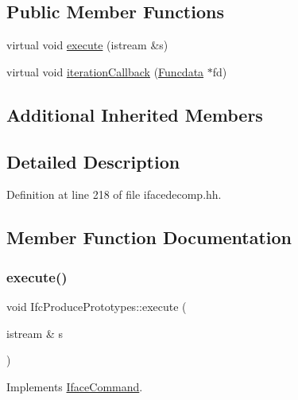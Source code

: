 \subsection*{Public Member Functions}
\begin{DoxyCompactItemize}
\item 
virtual void \mbox{\hyperlink{class_ifc_produce_prototypes_a26647bb5ac26d0ab368034f8c1823289}{execute}} (istream \&s)
\item 
virtual void \mbox{\hyperlink{class_ifc_produce_prototypes_abff378a291a5e7dd0c24d8ced5c9c4ea}{iteration\+Callback}} (\mbox{\hyperlink{class_funcdata}{Funcdata}} $\ast$fd)
\end{DoxyCompactItemize}
\subsection*{Additional Inherited Members}


\subsection{Detailed Description}


Definition at line 218 of file ifacedecomp.\+hh.



\subsection{Member Function Documentation}
\mbox{\label{class_ifc_produce_prototypes_a26647bb5ac26d0ab368034f8c1823289}} 
\subsubsection{\texorpdfstring{execute()}{execute()}}
{\footnotesize\ttfamily void Ifc\+Produce\+Prototypes\+::execute (\begin{DoxyParamCaption}\item[{istream \&}]{s }\end{DoxyParamCaption})\hspace{0.3cm}{\ttfamily [virtual]}}



Implements \mbox{\hyperlink{class_iface_command_af10e29cee2c8e419de6efe9e680ad201}{Iface\+Command}}.



